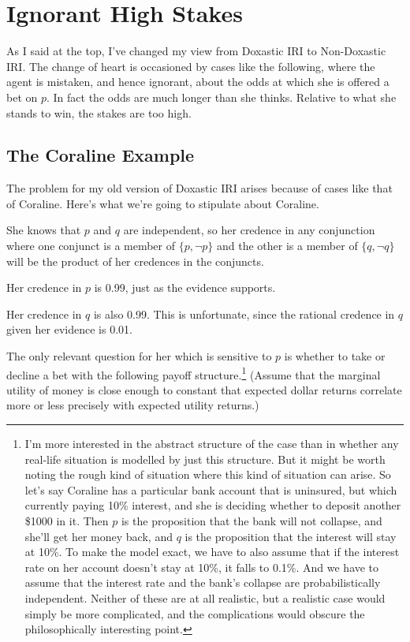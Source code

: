 \section{Ignorant High Stakes}

As I said at the top, I've changed my view from Doxastic IRI to Non-Doxastic IRI. The change of heart is occasioned by cases like the following, where the agent is mistaken, and hence ignorant, about the odds at which she is offered a bet on $p$. In fact the odds are much longer than she thinks. Relative to what she stands to win, the stakes are too high.

\subsection{The Coraline Example}
The problem for my old version of Doxastic IRI arises because of cases like that of Coraline. Here's what we're going to stipulate about Coraline.

\begin{itemize*}
\item She knows that \(p\) and \(q\) are independent, so her credence in any conjunction where one conjunct is a member of  \(\{p,  \neg p\}\) and the other is a member of \(\{q, \neg q\}\) will be the product of her credences in the conjuncts.
\item Her credence in \(p\) is 0.99, just as the evidence supports.
\item Her credence in \(q\) is also 0.99. This is unfortunate, since the rational credence in \(q\) given her evidence is 0.01.
\item The only relevant question for her which is sensitive to $p$ is whether to take or decline a bet with the following payoff structure.\footnote{I'm more interested in the abstract structure of the case than in whether any real-life situation is modelled by just this structure. But it might be worth noting the rough kind of situation where this kind of situation can arise. So let's say Coraline has a particular bank account that is uninsured, but which currently paying 10\% interest, and she is deciding whether to deposit another \$1000 in it. Then \(p\) is the proposition that the bank will not collapse, and she'll get her money back, and \(q\) is the proposition that the interest will stay at 10\%. To make the model exact, we have to also assume that if the interest rate on her account doesn't stay at 10\%, it falls to 0.1\%. And we have to assume that the interest rate and the bank's collapse are probabilistically independent. Neither of these are at all realistic, but a realistic case would simply be more complicated, and the complications would obscure the philosophically interesting point.} (Assume that the marginal utility of money is close enough to constant that expected dollar returns correlate more or less precisely with expected utility returns.)
\end{itemize*}

